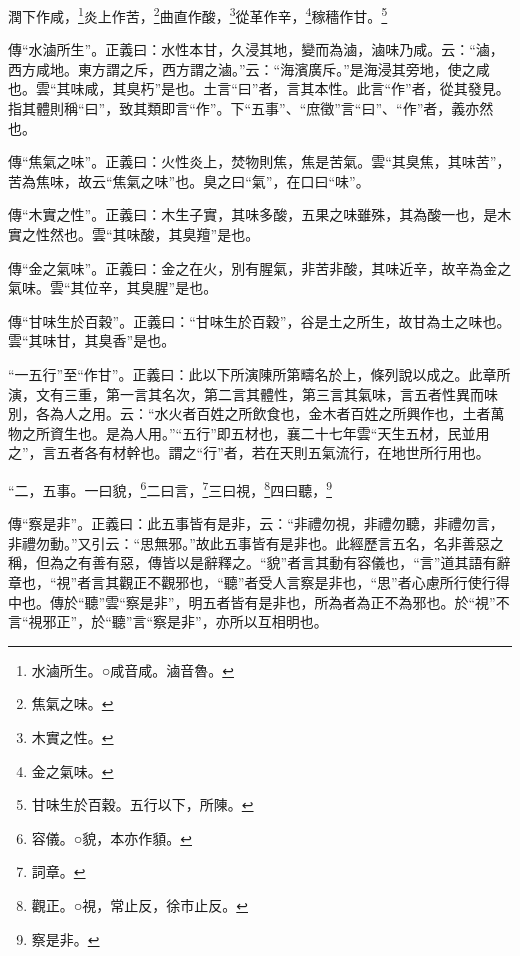 潤下作咸，\footnote{水滷所生。○咸音咸。滷音魯。}炎上作苦，\footnote{焦氣之味。}曲直作酸，\footnote{木實之性。}從革作辛，\footnote{金之氣味。}稼穡作甘。\footnote{甘味生於百穀。五行以下，所陳。}

{\noindent\zhuan{}\fzbyks 傳“水滷所生”。正義曰：水性本甘，久浸其地，變而為滷，滷味乃咸。云：“滷，西方咸地。東方謂之斥，西方謂之滷。”云：“海濱廣斥。”是海浸其旁地，使之咸也。雲“其味咸，其臭朽”是也。土言“曰”者，言其本性。此言“作”者，從其發見。指其體則稱“曰”，致其類即言“作”。下“五事”、“庶徵”言“曰”、“作”者，義亦然也。 \par}

{\noindent\zhuan{}\fzbyks 傳“焦氣之味”。正義曰：火性炎上，焚物則焦，焦是苦氣。雲“其臭焦，其味苦”，苦為焦味，故云“焦氣之味”也。臭之曰“氣”，在口曰“味”。 \par}

{\noindent\zhuan{}\fzbyks 傳“木實之性”。正義曰：木生子實，其味多酸，五果之味雖殊，其為酸一也，是木實之性然也。雲“其味酸，其臭羶”是也。 \par}

{\noindent\zhuan{}\fzbyks 傳“金之氣味”。正義曰：金之在火，別有腥氣，非苦非酸，其味近辛，故辛為金之氣味。雲“其位辛，其臭腥”是也。 \par}

{\noindent\zhuan{}\fzbyks 傳“甘味生於百穀”。正義曰：“甘味生於百穀”，谷是土之所生，故甘為土之味也。雲“其味甘，其臭香”是也。 \par}

{\noindent\shu{}\fzkt “一五行”至“作甘”。正義曰：此以下所演陳所第疇名於上，條列說以成之。此章所演，文有三重，第一言其名次，第二言其體性，第三言其氣味，言五者性異而味別，各為人之用。云：“水火者百姓之所飲食也，金木者百姓之所興作也，土者萬物之所資生也。是為人用。”“五行”即五材也，襄二十七年雲“天生五材，民並用之”，言五者各有材幹也。謂之“行”者，若在天則五氣流行，在地世所行用也。 \par}

“二，五事。一曰貌，\footnote{容儀。○貌，本亦作{\hanaa 䫉}。}二曰言，\footnote{詞章。}三曰視，\footnote{觀正。○視，常止反，徐市止反。}四曰聽，\footnote{察是非。}


{\noindent\zhuan{}\fzbyks 傳“察是非”。正義曰：此五事皆有是非，云：“非禮勿視，非禮勿聽，非禮勿言，非禮勿動。”又引云：“思無邪。”故此五事皆有是非也。此經歷言五名，名非善惡之稱，但為之有善有惡，傳皆以是辭釋之。“貌”者言其動有容儀也，“言”道其語有辭章也，“視”者言其觀正不觀邪也，“聽”者受人言察是非也，“思”者心慮所行使行得中也。傳於“聽”雲“察是非”，明五者皆有是非也，所為者為正不為邪也。於“視”不言“視邪正”，於“聽”言“察是非”，亦所以互相明也。 \par}

